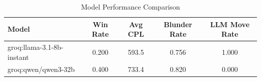 \begin{table}[h]
\centering
\caption{Model Performance Comparison}
\begin{tabular}{lcccc}
\toprule
Model & Win Rate & Avg CPL & Blunder Rate & LLM Move Rate \\
\midrule
groq:llama-3.1-8b-instant & 0.200 & 593.5 & 0.756 & 1.000 \\
groq:qwen/qwen3-32b & 0.400 & 733.4 & 0.820 & 0.000 \\
\bottomrule
\end{tabular}
\end{table}
